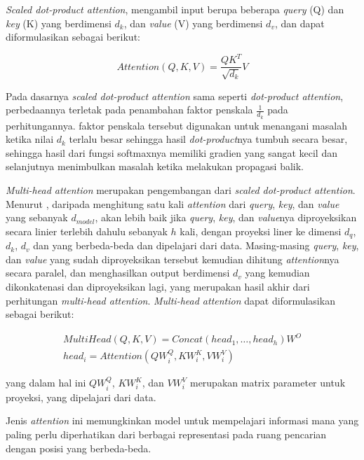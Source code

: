 \textit{Scaled dot-product attention}, mengambil input berupa beberapa \textit{query} (Q) dan \textit{key} (K) yang berdimensi \(d_{k}\), dan \textit{value} (V) yang berdimensi \(d_{v}\), dan dapat diformulasikan sebagai berikut:

\[
    Attention(Q,K,V) = \frac{QK^{T}}{\sqrt{d_{k}}}V    
\]

Pada dasarnya \textit{scaled dot-product attention} sama seperti \textit{dot-product attention}, perbedaannya terletak pada penambahan faktor penskala \(\frac{1}{d_{k}}\) pada perhitungannya. faktor penskala tersebut digunakan untuk menangani masalah ketika nilai  \(d_{k}\) terlalu besar sehingga hasil \textit{dot-product}nya tumbuh secara besar, sehingga hasil dari fungsi softmaxnya memiliki gradien yang sangat kecil dan selanjutnya menimbulkan masalah ketika melakukan propagasi balik.
\bigskip

\textit{Multi-head attention} merupakan pengembangan dari \textit{scaled dot-product attention}. Menurut \textcite{Vaswani2017}, daripada menghitung satu kali \textit{attention} dari \textit{query}, \textit{key}, dan \textit{value} yang sebanyak \(d_{model}\), akan lebih baik jika \textit{query}, \textit{key}, dan \textit{value}nya diproyeksikan secara linier terlebih dahulu sebanyak \(h\) kali, dengan proyeksi liner ke dimensi \(d_{q}\), \(d_{k}\), \(d_{v}\) dan  yang berbeda-beda dan dipelajari dari data. Masing-masing \textit{query}, \textit{key}, dan \textit{value} yang sudah diproyeksikan tersebut kemudian dihitung \textit{attention}nya secara paralel, dan menghasilkan output berdimensi \(d_{v}\) yang kemudian dikonkatenasi dan diproyeksikan lagi, yang merupakan hasil akhir dari perhitungan \textit{multi-head attention}. \textit{Multi-head attention} dapat diformulasikan sebagai berikut:

\begin{equation*}
    \begin{split}
        MultiHead(Q,K,V) = Concat(head_{1},\dots,head_{h})W^{O} \\
        head_{i} = Attention(QW^{Q}_{i},KW^{K}_{i},VW^{V}_{i})
    \end{split}
\end{equation*}

yang dalam hal ini \(QW^{Q}_{i}\), \(KW^{K}_{i}\), dan \(VW^{V}_{i}\) merupakan matrix parameter untuk proyeksi, yang dipelajari dari data.
\bigskip

Jenis \textit{attention} ini memungkinkan model untuk mempelajari informasi mana yang paling perlu diperhatikan dari berbagai representasi pada ruang pencarian dengan posisi yang berbeda-beda.

